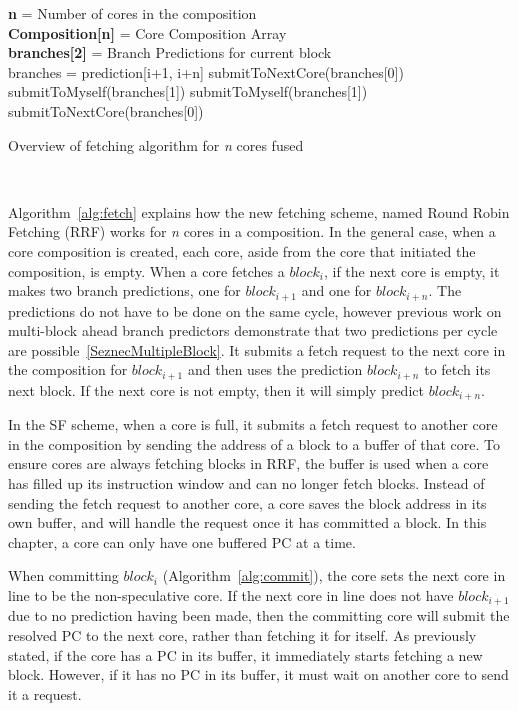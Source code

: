 \begin{algorithm}[t]

\textbf{n} = Number of cores in the composition\\
\textbf{Composition[n]} = Core Composition Array\\
\textbf{branches[2]} = Branch Predictions for current block\\

{
{
	branches = prediction[i+1, i+n]
}
{
	{
		submitToNextCore(branches[0])\\
		submitToMyself(branches[1])
	}
	{
		submitToMyself(branches[1])\\
	}
}
{
	{
		submitToNextCore(branches[0])\\
	}
}	
}
\caption{Overview of fetching algorithm for \textit{n} cores fused}~\label{alg:fetch}
\end{algorithm}

Algorithm~\ref{alg:fetch} explains how the new fetching scheme, named Round Robin Fetching (RRF) works for \textit{n} cores in a composition.
In the general case, when a core composition is created, each core, aside from the core that initiated the composition, is empty.
When a core fetches a $block_i$, if the next core is empty, it makes two branch predictions, one for $block_{i+1}$ and one for $block_{i+n}$.
The predictions do not have to be done on the same cycle, however previous work on multi-block ahead branch predictors demonstrate that two predictions per cycle are possible~\ref{SeznecMultipleBlock}.
It submits a fetch request to the next core in the composition for $block_{i+1}$ and then uses the prediction $block_{i+n}$ to fetch its next block.
If the next core is not empty, then it will simply predict $block_{i+n}$.

In the SF scheme, when a core is full, it submits a fetch request to another core in the composition by sending the address of a block to a buffer of that core.
To ensure cores are always fetching blocks in RRF, the buffer is used when a core has filled up its instruction window and can no longer fetch blocks.
Instead of sending the fetch request to another core, a core saves the block address in its own buffer, and will handle the request once it has committed a block.
In this chapter, a core can only have one buffered PC at a time.

When committing $block_i$ (Algorithm~\ref{alg:commit}), the core sets the next core in line to be the non-speculative core.
If the next core in line does not have $block_{i+1}$ due to no prediction having been made, then the committing core will submit the resolved PC to the next core, rather than fetching it for itself.
As previously stated, if the core has a PC in its buffer, it immediately starts fetching a new block.
However, if it has no PC in its buffer, it must wait on another core to send it a request.

